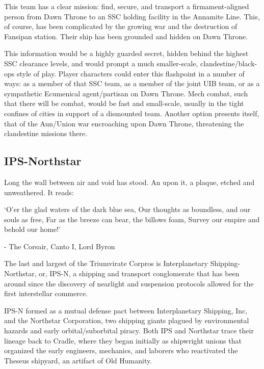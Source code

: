 This team has a clear mission: find, secure, and transport a firmament-aligned person from Dawn
Throne to an SSC holding facility in the Annamite Line. This, of course, has been complicated by
the growing war and the destruction of Fansipan station. Their ship has been grounded and
hidden on Dawn Throne.

This information would be a highly guarded secret, hidden behind the highest SSC clearance
levels, and would prompt a much smaller-scale, clandestine/black-ops style of play. Player
characters could enter this flashpoint in a number of ways: as a member of that SSC team, as a
member of the joint UIB team, or as a sympathetic Ecumenical agent/partisan on Dawn Throne.
Mech combat, such that there will be combat, would be fast and small-scale, usually in the tight
confines of cities in support of a dismounted team.  Another option presents itself, that of the
Aun/Union war encroaching upon Dawn Throne, threatening the clandestine missions there.

\subsection{IPS-Northstar}
\begin{loreQuote}
              Long the wall between air and void has stood. An upon it, a plaque, etched
              and unweathered. It reads:
\begin{loreQuote}
              ‘O'er the glad waters of the dark blue sea,
              Our thoughts as boundless, and our souls as free,
              Far as the breeze can bear, the billows foam,
              Survey our empire and behold our home!'

              \qquad - \quad The Corsair, Canto I, Lord Byron
\end{loreQuote}
\end{loreQuote}

The last and largest of the Triumvirate Corpros is Interplanetary Shipping-Northstar, or, IPS-N, a
shipping and transport conglomerate that has been around since the discovery of nearlight and
suspension protocols allowed for the first interstellar commerce.

IPS-N formed as a mutual defense pact between Interplanetary Shipping, Inc, and the Northstar
Corporation, two shipping giants plagued by environmental hazards and early orbital/suborbital
piracy. Both IPS and Northstar trace their lineage back to Cradle, where they began initially as
shipwright unions that organized the early engineers, mechanics, and laborers who reactivated
the Theseus shipyard, an artifact of Old Humanity.

